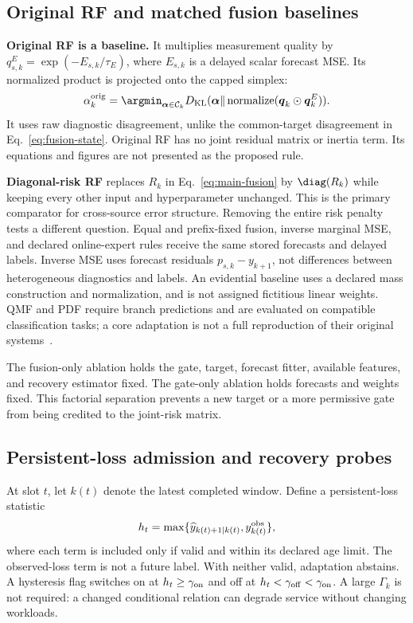 \subsection{Original RF and matched fusion baselines}
\label{sec:baselines}

\textbf{Original RF is a baseline.} It multiplies measurement quality by
$q_{s,k}^E=\exp(-E_{s,k}/\tau_E)$, where $E_{s,k}$ is a delayed scalar
forecast MSE. Its normalized product is projected onto the capped simplex:
\begin{equation}
 \alpha_k^{\rm orig}=\argmin_{\boldsymbol\alpha\in\mathcal C_k}
 D_{\rm KL}(\boldsymbol\alpha\Vert
      \operatorname{normalize}(\boldsymbol q_k\odot\boldsymbol q_k^E)).
\end{equation}
It uses raw diagnostic disagreement, unlike the common-target disagreement
in Eq.~\eqref{eq:fusion-state}. Original RF has no joint residual matrix or
inertia term. Its equations and figures are not presented as the proposed rule.

\textbf{Diagonal-risk RF} replaces $R_k$ in Eq.~\eqref{eq:main-fusion} by
$\diag(R_k)$ while keeping every other input and hyperparameter unchanged.
This is the primary comparator for cross-source error structure. Removing the
entire risk penalty tests a different question. Equal and prefix-fixed fusion,
inverse marginal MSE, and declared online-expert rules receive the same stored
forecasts and delayed labels. Inverse MSE uses forecast residuals
$p_{s,k}-y_{k+1}$, not differences between heterogeneous diagnostics and labels.
An evidential baseline uses a declared mass construction and normalization,
and is not assigned fictitious linear weights. QMF and PDF require branch
predictions and are evaluated on compatible classification tasks; a core
adaptation is not a full reproduction of their original
systems~\cite{qmf2023,pdf2024}.

The fusion-only ablation holds the gate, target, forecast fitter, available
features, and recovery estimator fixed. The gate-only ablation holds forecasts
and weights fixed. This factorial separation prevents a new target or a more
permissive gate from being credited to the joint-risk matrix.

\subsection{Persistent-loss admission and recovery probes}
\label{sec:coordination}

At slot $t$, let $k(t)$ denote the latest completed window.
Define a persistent-loss statistic
\begin{equation}
 h_t=\max\{\widehat y_{k(t)+1|k(t)},y_{k(t)}^{\rm obs}\},
 \label{eq:loss-sentinel}
\end{equation}
where each term is included only if valid and within its declared age limit.
The observed-loss term is not a future label. With neither valid, adaptation
abstains. A hysteresis flag switches on at $h_t\ge\gamma_{\rm on}$ and off
at $h_t<\gamma_{\rm off}<\gamma_{\rm on}$. A large $\Gamma_k$ is not required:
a changed conditional relation can degrade service without changing workloads.

